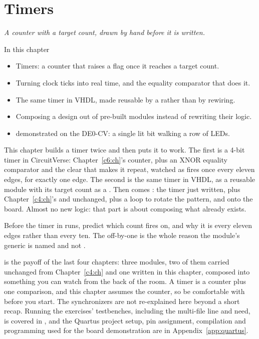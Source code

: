 
\chapter{Timers}
\label{c7:ch}

{\large\itshape A counter with a target count, drawn by hand before it is written.\par}

\begin{chapterbox}{In this chapter}
\begin{itemize}
  \item Timers: a counter that raises a flag once it reaches a target count.
  \item Turning clock ticks into real time, and the equality comparator that does it.
  \item The same timer in VHDL, made reusable by a  rather than by rewiring.
  \item Composing a design out of pre-built modules instead of rewriting their logic.
  \item {} demonstrated on the DE0-CV: a single lit bit walking a row of LEDs.
\end{itemize}
\end{chapterbox}

This chapter builds a timer twice and then puts it to work. The first is a 4-bit timer in
CircuitVerse: Chapter~\ref{c6:ch}'s counter, plus an XNOR equality comparator and the clear that
makes it repeat, watched as  fires once every eleven edges, for exactly one edge. The
second is the same timer in VHDL, as a reusable module with its target count as a .
Then comes : the timer just written, plus Chapter~\ref{c4:ch}'s
 and  unchanged, plus a loop to rotate the pattern, and onto the
board. Almost no new logic: that part is about composing what already exists.

Before the timer in  runs, predict which count  fires on, and why it is
every eleven edges rather than every ten. The off-by-one is the whole reason the module's generic
is named  and not .

 is the payoff of the last four chapters: three modules, two of them carried
unchanged from Chapter~\ref{c4:ch} and one written in this chapter, composed into something you can
watch from the back of the room. A timer is a counter plus one comparison, and this chapter assumes
the counter, so be comfortable with  before you start. The synchronizers are not
re-explained here beyond a short recap. Running the exercises' testbenches, including the
multi-file  line  and  need, is covered in
, and the Quartus project setup, pin assignment, compilation and programming used
for the board demonstration are in Appendix~\ref{app:quartus}.




